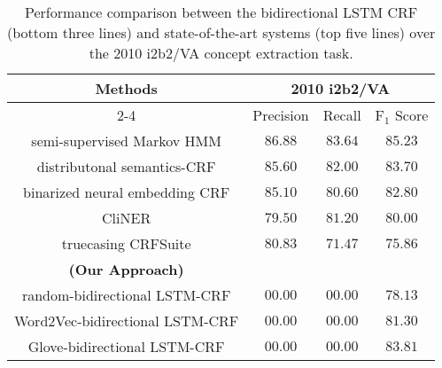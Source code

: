 \begin{table*}[ht]
  \centering

    \begin{tabular}{|c|c|c|c|}
      \hline
      \multirow{3}{*}{Methods} &
      \multicolumn{3}{c|}{\bf {\small 2010 i2b2/VA}} \\
      \cline{2-4}
      & Precision & Recall & F$_1$ Score \\
      \hline
      semi-supervised Markov HMM \cite{de2011machine} &$86.88$ &$83.64$ & $85.23$ \\
      distributonal semantics-CRF \cite{jonnalagadda2012enhancing} &$85.60$&$82.00$ &$83.70$  \\
      binarized neural embedding CRF\cite{wu2015study}&$85.10$&$80.60$ & $82.80$ \\
      CliNER \cite{boagcliner}&$79.50$&$81.20$ & $80.00$ \\
      truecasing CRFSuite \cite{fu2014improving}&$80.83$&$7 1.47$ & $75.86$ \\
      \hline
      \bf(Our Approach) & & &  \\
      random-bidirectional LSTM-CRF &$00.00$ &$00.00$ & $78.13$ \\
      Word2Vec-bidirectional LSTM-CRF &$00.00$ &$00.00$ & $81.30$ \\
      Glove-bidirectional LSTM-CRF &$00.00$ &$00.00$ & $83.81$ \\
      \hline
    \end{tabular}
    \caption{Performance comparison between the bidirectional LSTM CRF (bottom three lines) and state-of-the-art systems (top five lines) over the 2010 i2b2/VA concept extraction task.}
    \label{table3}
  \end{table*}


